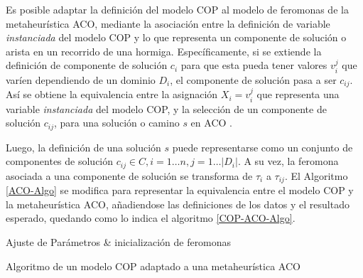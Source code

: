 Es posible adaptar la definici\'on del modelo COP al modelo de feromonas de la metaheur\'istica ACO, mediante la asociaci\'on entre la definici\'on de variable {\it instanciada} del modelo COP y lo que representa un componente de soluci\'on o arista en un recorrido de una hormiga. 
Espec\'ificamente, si se extiende la definici\'on de componente de soluci\'on $c_{i}$ para que esta pueda tener valores $v_{i}^{j}$ que var\'ien dependiendo de un dominio $D_i$, el componente de soluci\'on pasa a ser $c_{ij}$. As\'i se obtiene la equivalencia entre la asignaci\'on $X_i = v_{i}^{j}$ que representa una variable {\it instanciada} del modelo COP, y la selecci\'on de un componente de soluci\'on $c_{ij}$,  para una soluci\'on o camino $s$ en ACO .


Luego, la definici\'on de una soluci\'on $s$ puede representarse como un conjunto de componentes de soluci\'on $c_{ij} \in C, i = 1 \dotsc n, j = 1 \dotsc |D_i|$. A su vez, la feromona asociada a una componente de soluci\'on se transforma de $\tau_i$ a $\tau_{ij}$. El Algoritmo  \ref{ACO-Algo} se modifica para representar la equivalencia entre el modelo COP y la metaheur\'istica ACO, a\~nadiendose las definiciones de los datos y el resultado esperado, quedando como lo indica el algoritmo \ref{COP-ACO-Algo}. 


\begin{algorithm}[H]
\SetAlgoLined
{}
 Ajuste de Par\'ametros \& inicializaci\'on de feromonas \;
 \caption{Algoritmo de un modelo COP adaptado a una metaheur\'istica ACO}\label{COP-ACO-Algo}
\end{algorithm}




